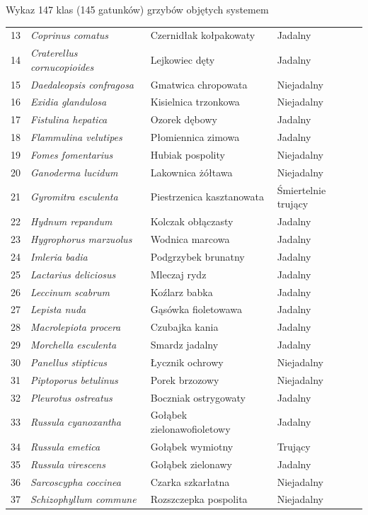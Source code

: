 \begin{easyappendix}{Wykaz 147 klas (145 gatunków) grzybów objętych systemem}
\begin{longtable}{|r|l|l|l|}
13 & \textit{Coprinus comatus} & Czernidłak kołpakowaty & Jadalny \\
14 & \textit{Craterellus cornucopioides} & Lejkowiec dęty & Jadalny \\
15 & \textit{Daedaleopsis confragosa} & Gmatwica chropowata & Niejadalny \\
16 & \textit{Exidia glandulosa} & Kisielnica trzonkowa & Niejadalny \\
17 & \textit{Fistulina hepatica} & Ozorek dębowy & Jadalny \\
18 & \textit{Flammulina velutipes} & Płomiennica zimowa & Jadalny \\
19 & \textit{Fomes fomentarius} & Hubiak pospolity & Niejadalny \\
20 & \textit{Ganoderma lucidum} & Lakownica żółtawa & Niejadalny \\
21 & \textit{Gyromitra esculenta} & Piestrzenica kasztanowata & Śmiertelnie trujący \\
22 & \textit{Hydnum repandum} & Kolczak obłączasty & Jadalny \\
23 & \textit{Hygrophorus marzuolus} & Wodnica marcowa & Jadalny \\
24 & \textit{Imleria badia} & Podgrzybek brunatny & Jadalny \\
25 & \textit{Lactarius deliciosus} & Mleczaj rydz & Jadalny \\
26 & \textit{Leccinum scabrum} & Koźlarz babka & Jadalny \\
27 & \textit{Lepista nuda} & Gąsówka fioletowawa & Jadalny \\
28 & \textit{Macrolepiota procera} & Czubajka kania & Jadalny \\
29 & \textit{Morchella esculenta} & Smardz jadalny & Jadalny \\
30 & \textit{Panellus stipticus} & Łycznik ochrowy & Niejadalny \\
31 & \textit{Piptoporus betulinus} & Porek brzozowy & Niejadalny \\
32 & \textit{Pleurotus ostreatus} & Boczniak ostrygowaty & Jadalny \\
33 & \textit{Russula cyanoxantha} & Gołąbek zielonawofioletowy & Jadalny \\
34 & \textit{Russula emetica} & Gołąbek wymiotny & Trujący \\
35 & \textit{Russula virescens} & Gołąbek zielonawy & Jadalny \\
36 & \textit{Sarcoscypha coccinea} & Czarka szkarłatna & Niejadalny\\
37 & \textit{Schizophyllum commune} & Rozszczepka pospolita & Niejadalny \\

\end{longtable}
\end{easyappendix}
